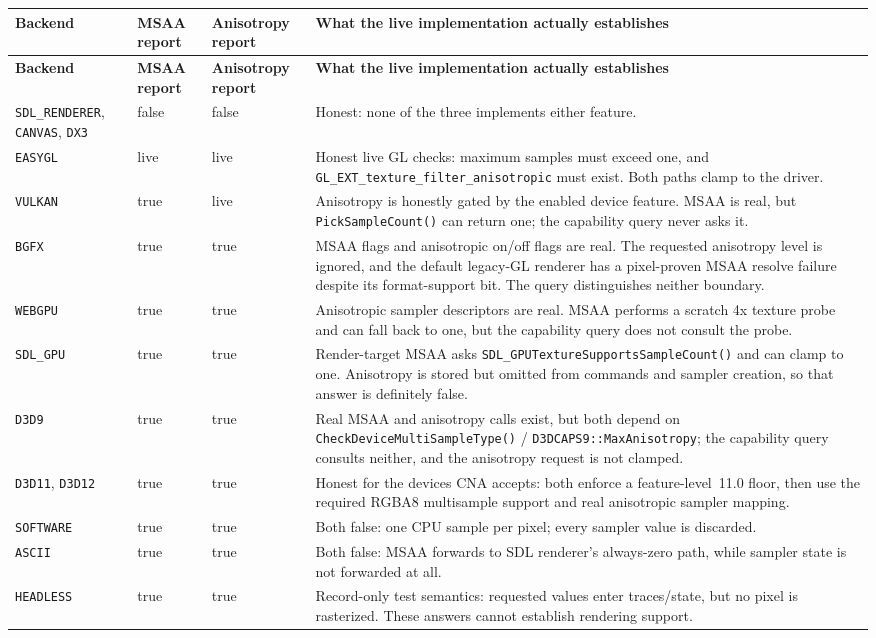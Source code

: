 \begingroup
\small
\setlength{\tabcolsep}{4pt}
\renewcommand{\arraystretch}{1.15}
\begin{longtable}{@{}p{}p{}p{}p{}@{}}
\toprule
\textbf{Backend} & \textbf{MSAA report} & \textbf{Anisotropy report} & \textbf{What the live implementation actually establishes} \\
\midrule
\endfirsthead
\toprule
\textbf{Backend} & \textbf{MSAA report} & \textbf{Anisotropy report} & \textbf{What the live implementation actually establishes} \\
\midrule
\endhead
\texttt{SDL\_RENDERER}, \texttt{CANVAS}, \texttt{DX3}
  & false & false & Honest: none of the three implements either feature. \\
\texttt{EASYGL}
  & live & live & Honest live GL checks: maximum samples must exceed one, and
    \texttt{GL\_EXT\_texture\_filter\_anisotropic} must exist. Both paths clamp to the driver. \\
\texttt{VULKAN}
  & true & live & Anisotropy is honestly gated by the enabled device feature. MSAA is real, but
    \texttt{PickSampleCount()} can return one; the capability query never asks it. \\
\texttt{BGFX}
  & true & true & MSAA flags and anisotropic on/off flags are real. The requested anisotropy
    level is ignored, and the default legacy-GL renderer has a pixel-proven MSAA resolve failure
    despite its format-support bit. The query distinguishes neither boundary. \\
\texttt{WEBGPU}
  & true & true & Anisotropic sampler descriptors are real. MSAA performs a scratch 4x texture
    probe and can fall back to one, but the capability query does not consult the probe. \\
\texttt{SDL\_GPU}
  & true & true & Render-target MSAA asks
    \texttt{SDL\_GPUTextureSupportsSampleCount()} and can clamp to one. Anisotropy is stored but
    omitted from commands and sampler creation, so that answer is definitely false. \\
\texttt{D3D9}
  & true & true & Real MSAA and anisotropy calls exist, but both depend on
    \texttt{CheckDeviceMultiSampleType()} / \texttt{D3DCAPS9::MaxAnisotropy}; the capability query
    consults neither, and the anisotropy request is not clamped. \\
\texttt{D3D11}, \texttt{D3D12}
  & true & true & Honest for the devices CNA accepts: both enforce a feature-level~11.0 floor,
    then use the required RGBA8 multisample support and real anisotropic sampler mapping. \\
\texttt{SOFTWARE}
  & true & true & Both false: one CPU sample per pixel; every sampler value is discarded. \\
\texttt{ASCII}
  & true & true & Both false: MSAA forwards to SDL renderer's always-zero path, while sampler
    state is not forwarded at all. \\
\texttt{HEADLESS}
  & true & true & Record-only test semantics: requested values enter traces/state, but no pixel
    is rasterized. These answers cannot establish rendering support. \\
\bottomrule
\end{longtable}
\endgroup

